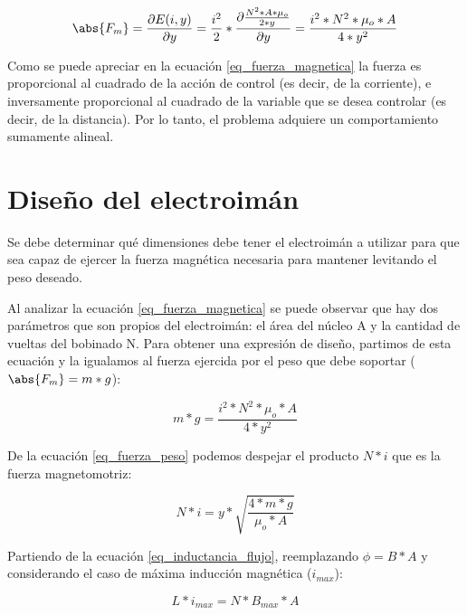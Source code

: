 \begin{equation}\label{eq_fuerza_magnetica}
	\abs{F_{m}}=\frac{\partial{E(i,y)}}{\partial{y}}=\frac{i^{2}}{2}*\frac{\partial{\frac{{N^{2}*A*\mu_{o}}}{2*y}}}{\partial{y}}=\frac{i^{2}*N^{2}*\mu_{o}*A}{4*y^{2}}
\end{equation}

\noindent Como se puede apreciar en la ecuación \ref{eq_fuerza_magnetica} la fuerza es proporcional al cuadrado de la acción de control (es decir, de la corriente), e inversamente proporcional al cuadrado de la variable que se desea controlar (es decir, de la distancia). Por lo tanto, el problema adquiere un comportamiento sumamente alineal.

\section{Diseño del electroimán}

\noindent Se debe determinar qué dimensiones debe tener el electroimán a utilizar para que sea capaz de ejercer la fuerza magnética necesaria para mantener levitando el peso deseado.

\noindent Al analizar la ecuación \ref{eq_fuerza_magnetica} se puede observar que hay dos parámetros que son propios del electroimán: el área del núcleo A y la cantidad de vueltas del bobinado N. Para obtener una expresión de diseño, partimos de esta ecuación y la igualamos al fuerza ejercida por el peso que debe soportar ($\abs{F_{m}}=m*g$):

\begin{equation}\label{eq_fuerza_peso}
	m*g=\frac{i^{2}*N^{2}*\mu_{o}*A}{4*y^{2}}
\end{equation}

\noindent De la ecuación \ref{eq_fuerza_peso} podemos despejar el producto $N*i$ que es la fuerza magnetomotriz:

\begin{equation} \label{eq_n_por_i}
	N*i=y*\sqrt{\frac{4*m*g}{\mu_{o}*A}}
\end{equation}

\noindent Partiendo de la ecuación \ref{eq_inductancia_flujo}, reemplazando $\phi=B*A$ y considerando el caso de máxima inducción magnética ($i_{max}$):

\begin{equation}\label{eq_inductancia_densidad}
	L*i_{max}=N*B_{max}*A
\end{equation}

